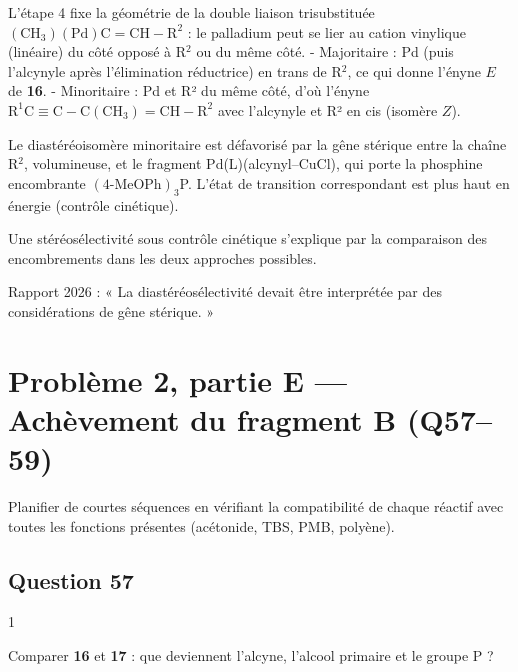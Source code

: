 \documentclass[11pt,a4paper]{article}
\begin{document}
L'étape 4 fixe la géométrie de la double liaison trisubstituée \(\mathrm{(CH_3)(Pd)C{=}CH{-}R^2}\) : le palladium peut se lier au cation vinylique (linéaire) du côté opposé à R\(^2\) ou du même côté.
- Majoritaire : Pd (puis l'alcynyle après l'élimination réductrice) en trans de R\(^2\), ce qui donne l'ényne \(E\) de \textbf{16}.
- Minoritaire : Pd et R² du même côté, d'où l'ényne \(\mathrm{R^1C{\equiv}C{-}C(CH_3){=}CH{-}R^2}\) avec l'alcynyle et R² en cis (isomère \(Z\)).

Le diastéréoisomère minoritaire est défavorisé par la gêne stérique entre la chaîne R\(^2\), volumineuse, et le fragment Pd(L)(alcynyl--CuCl), qui porte la phosphine encombrante \((4\text{-MeOPh})_3\)P. L'état de transition correspondant est plus haut en énergie (contrôle cinétique).

\begin{methode}

Une stéréosélectivité sous contrôle cinétique s'explique par la comparaison des encombrements dans les deux approches possibles.

\end{methode}

\begin{jury}

Rapport 2026 : « La diastéréosélectivité devait être interprétée par des considérations de gêne stérique. »

\end{jury}

\hypertarget{probluxe8me-2-partie-e-achuxe8vement-du-fragment-b-q5759}{%
\section{Problème 2, partie E --- Achèvement du fragment B (Q57--59)}\label{probluxe8me-2-partie-e-achuxe8vement-du-fragment-b-q5759}}

Planifier de courtes séquences en vérifiant la compatibilité de chaque réactif avec toutes les fonctions présentes (acétonide, TBS, PMB, polyène).

\hypertarget{question-57}{%
\subsection{Question 57}\label{question-57}}

\begin{indication}{1}

Comparer \textbf{16} et \textbf{17} : que deviennent l'alcyne, l'alcool primaire et le groupe P ?

\end{indication}
\end{document}
